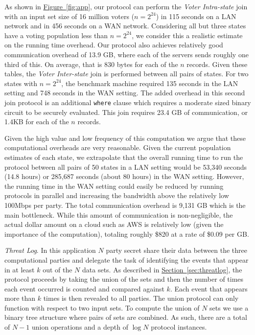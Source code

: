 \documentclass[11pt,letterpaper]{article}
\newcommand{\namedref}[2]{\hyperref[#2]{#1~\ref*{#2}}}
\newcommand{\sectionref}[1]{\namedref{Section}{#1}}
\newcommand{\figureref}[1]{\namedref{Figure}{#1}}
\renewcommand{\paragraph}[1]{\vspace{0.1cm}\noindent\emph{#1}.}
\begin{document}
As shown in \figureref{fig:app}, our  protocol can perform the \emph{Voter Intra-state} join with an input set size of 16 million voters ($n=2^{24}$) in 115 seconds on a LAN network and in 456 seconds on a WAN network. Considering all but three states have a voting population less than $n=2^{24}$, we consider this a realistic estimate on the running time overhead. Our protocol also achieves relatively good communication overhead of 13.9 GB, where each of the servers sends roughly one third of this. On average, that is 830 bytes for each of the $n$ records. Given these tables, the \emph{Voter Inter-state} join is performed between all pairs of states. For two states with $n=2^{24}$, the benchmark machine required 135 seconds in the LAN setting and 748 seconds in the WAN setting. The added overhead in this second join protocol is an additional \texttt{where} clause which requires a moderate sized binary circuit to be securely evaluated. This join requires 23.4 GB of communication, or 1.4KB for each of the $n$ records.

Given the high value and low frequency of this computation we argue that these computational overheads are very reasonable. Given the current population estimates of each state, we extrapolate that the overall running time to run the protocol between all pairs of 50 states in a LAN setting would be 53,340 seconds (14.8 hours) or  285,687 seconds (about 80 hours) in the WAN setting. However, the running time in the WAN setting could easily be reduced by running protocols in parallel and increasing the bandwidth above the relatively low 100Mbps per party. The total communication overhead is 9,131 GB which is the main bottleneck.  While this amount of communication is non-negligible, the actual dollar amount on a cloud such as AWS\cite{aws} is relatively low (given the importance of the computation), totaling roughly \$820 at a rate of \$0.09 per GB\cite{aws_pricing}. 


\paragraph{Threat Log} In this application $N$ party secret share their data between the three computational parties and delegate the task of identifying the events that appear in at least $k$ out of the $N$ data sets. As described in \sectionref{sec:threatlog}, the protocol proceeds by taking the union of the sets and then the number of times each event occurred is counted and compared against $k$. Each event that appears more than $k$ times is then revealed to all parties. The union protocol can only function with respect to two input sets. To compute the union of $N$ sets we use a binary tree structure where pairs of sets are combined. As such, there are a total of $N-1$ union operations and a depth of $\log N$ protocol instances.
\end{document}
